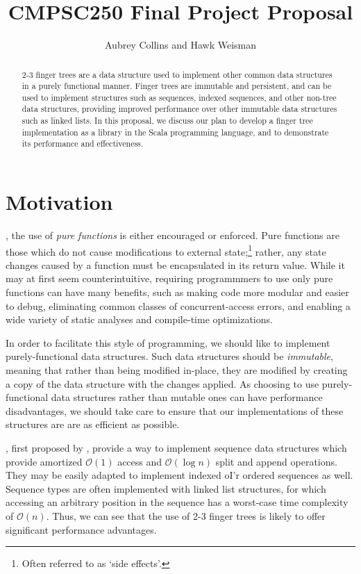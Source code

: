 \documentclass[a4paper,nobib]{tufte-handout}
\title{CMPSC250 Final Project Proposal}
\author{Aubrey Collins and Hawk Weisman}
\begin{document}
\maketitle
\begin{abstract}
2-3 finger trees are a data structure used to implement other common data structures in a purely functional manner.\cite{Hinze:2006:FTS:1114670.1114674} Finger trees are immutable and persistent, and can be used to implement structures such as sequences, indexed sequences, and other non-tree data structures, providing improved performance over other immutable data structures such as linked lists. In this proposal, we discuss our plan to develop a finger tree implementation as a library in the Scala programming language, and to demonstrate its performance and effectiveness.
\end{abstract}

\section{Motivation}
, the use of \textit{pure functions} is either encouraged or enforced. Pure functions are those which do not cause modifications to external state;\footnote{Often referred to as `side effects'.} rather, any state changes caused by a function must be encapsulated in its return value.\cite{JFP:44143} While it may at first seem counterintuitive, requiring programmmers to use only pure functions can have many benefits, such as making code more modular and easier to debug, eliminating common classes of concurrent-access errors, and enabling a wide variety of static analyses and compile-time optimizations.

In order to facilitate this style of programming, we should like to implement purely-functional data structures. Such data structures should be \textit{immutable}, meaning that rather than being modified in-place, they are modified by creating a copy of the data structure with the changes applied.\cite{okasaki1999purely} As choosing to use purely-functional data structures rather than mutable ones can have performance disadvantages, we should take care to ensure that our implementations of these structures are are as efficient as possible.

, first proposed by \citeauthor{Hinze:2006:FTS:1114670.1114674}, provide a way to implement sequence data structures which provide amortized $\mathcal{O}(1)$ access and $\mathcal{O}(\log n)$ split and append operations. They may be easily adapted to implement indexed oI'r ordered sequences as well.\cite{Hinze:2006:FTS:1114670.1114674} Sequence types are often implemented with linked list structures, for which accessing an arbitrary position in the sequence has a worst-case time complexity of $\mathcal{O}(n)$. Thus, we can see that the use of 2-3 finger trees is likely to offer significant performance advantages.
\end{document}

